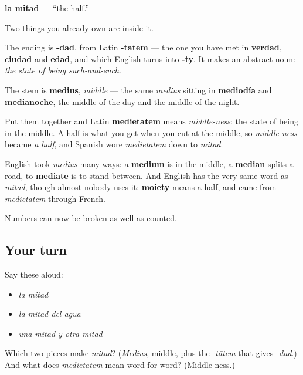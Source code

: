 \begin{cousinweb}
\textbf{la mitad} — \textquotedblleft{}the half.\textquotedblright{}

Two things you already own are inside it.

The ending is \textbf{-dad}, from Latin \textbf{-tātem} — the one you have met in \textbf{verdad}, \textbf{ciudad} and \textbf{edad}, and which English turns into \textbf{-ty}. It makes an abstract noun: \emph{the state of being such-and-such}.

The stem is \textbf{medius}, \emph{middle} — the same \emph{medius} sitting in \textbf{mediodía} and \textbf{medianoche}, the middle of the day and the middle of the night.

Put them together and Latin \textbf{medietātem} means \emph{middle-ness}: the state of being in the middle. A half is what you get when you cut at the middle, so \emph{middle-ness} became \emph{a half}, and Spanish wore \emph{medietatem} down to \emph{mitad}.

English took \emph{medius} many ways: a \textbf{medium} is in the middle, a \textbf{median} splits a road, to \textbf{mediate} is to stand between. And English has the very same word as \emph{mitad}, though almost nobody uses it: \textbf{moiety} means a half, and came from \emph{medietatem} through French.
\end{cousinweb}

\begin{grammarlens}[title={What you've built}]
Numbers can now be broken as well as counted.
\end{grammarlens}

\subsection*{Your turn}
Say these aloud:

\begin{itemize}
\raggedright
  \item \emph{la mitad}
  \item \emph{la mitad del agua}
  \item \emph{una mitad y otra mitad}
\end{itemize}

\begin{tcolorbox}[breakable,colback=teal!4,colframe=teal!35!black,title={Before you move on}]
Which two pieces make \emph{mitad}? (\emph{Medius}, middle, plus the \emph{-tātem} that gives \emph{-dad}.) And what does \emph{medietātem} mean word for word? (Middle-ness.)
\end{tcolorbox}
